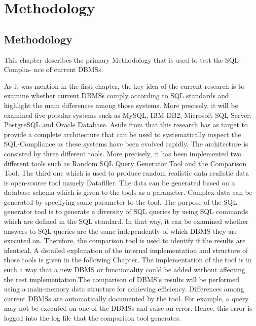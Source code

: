 
\chapter{Methodology}

\section{Methodology}
 
This chapter describes the primary Methodology that is used to test the SQL-Complia- nce of current DBMSs. 

As it was mention in the first chapter, the key idea of the current research is to examine whether current DBMSs comply according to SQL standards and highlight the main differences among those systems. More precisely, it will be examined five popular systems such as MySQL, IBM DB2, Microsoft SQL Server, PostgreSQL and Oracle Database. Aside from that this research has as target  to provide a complete architecture that can be used to systematically inspect the SQL-Compliance as these systems have been evolved rapidly. The architecture is consisted by three different tools. More precisely, it has been implemented two different tools such as Random SQL Query Generator Tool and the Comparison Tool. The third one which is used to produce random realistic data realistic data is open-source tool namely Datafiller. The data can be generated based on a database schema which is given to the tools as a parameter. Complex data can be generated by specifying some parameter to the tool.  The purpose of the SQL generator tool is to generate a diversity of SQL queries by using SQL commands which are defined in the SQL standard. In that way, it can be examined whether answers to SQL queries are the same independently of which DBMS they are executed on. Therefore, the comparison tool is used to identify if the results are identical. A detailed explanation of the internal implementation and structure of those tools is given in the following Chapter. The implementation of the tool is in such a way that a new DBMS or functionality could be added without affecting the rest implementation.The comparison of DBMS’s results will be performed using a main-memory data structure for achieving efficiency. Differences among current DBMSs are automatically documented by the tool. For example, a query may not be executed on one of the DBMSs and raise an error. Hence, this error is logged into the log file that the comparison tool generates. 








 